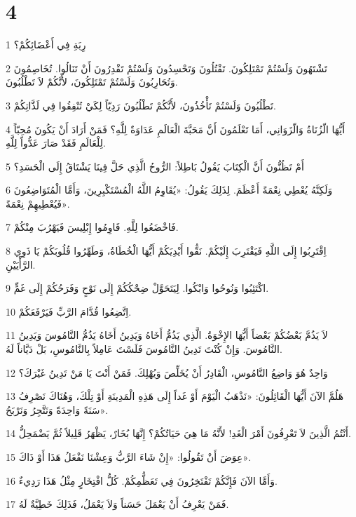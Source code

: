 \chapter{4}

\par 1 رِبَةِ فِي أَعْضَائِكُمْ؟
\par 2 تَشْتَهُونَ وَلَسْتُمْ تَمْتَلِكُونَ. تَقْتُلُونَ وَتَحْسِدُونَ وَلَسْتُمْ تَقْدِرُونَ أَنْ تَنَالُوا. تُخَاصِمُونَ وَتُحَارِبُونَ وَلَسْتُمْ تَمْتَلِكُونَ، لأَنَّكُمْ لاَ تَطْلُبُونَ.
\par 3 تَطْلُبُونَ وَلَسْتُمْ تَأْخُذُونَ، لأَنَّكُمْ تَطْلُبُونَ رَدِيّاً لِكَيْ تُنْفِقُوا فِي لَذَّاتِكُمْ.
\par 4 أَيُّهَا الّزُنَاةُ وَالّزَوَانِي، أَمَا تَعْلَمُونَ أَنَّ مَحَبَّةَ الْعَالَمِ عَدَاوَةٌ لِلَّهِ؟ فَمَنْ أَرَادَ أَنْ يَكُونَ مُحِبّاً لِلْعَالَمِ فَقَدْ صَارَ عَدُّواً لِلَّهِ.
\par 5 أَمْ تَظُنُّونَ أَنَّ الْكِتَابَ يَقُولُ بَاطِلاً: الرُّوحُ الَّذِي حَلَّ فِينَا يَشْتَاقُ إِلَى الْحَسَدِ؟
\par 6 وَلَكِنَّهُ يُعْطِي نِعْمَةً أَعْظَمَ. لِذَلِكَ يَقُولُ: «يُقَاوِمُ اللَّهُ الْمُسْتَكْبِرِينَ، وَأَمَّا الْمُتَوَاضِعُونَ فَيُعْطِيهِمْ نِعْمَةً».
\par 7 فَاخْضَعُوا لِلَّهِ. قَاوِمُوا إِبْلِيسَ فَيَهْرُبَ مِنْكُمْ.
\par 8 اِقْتَرِبُوا إِلَى اللَّهِ فَيَقْتَرِبَ إِلَيْكُمْ. نَقُّوا أَيْدِيَكُمْ أَيُّهَا الْخُطَاةُ، وَطَهِّرُوا قُلُوبَكُمْ يَا ذَوِي الرَّأْيَيْنِ.
\par 9 اكْتَئِبُوا وَنُوحُوا وَابْكُوا. لِيَتَحَوَّلْ ضِحْكُكُمْ إِلَى نَوْحٍ وَفَرَحُكُمْ إِلَى غَمٍّ.
\par 10 اِتَّضِعُوا قُدَّامَ الرَّبِّ فَيَرْفَعَكُمْ.
\par 11 لاَ يَذُمَّ بَعْضُكُمْ بَعْضاً أَيُّهَا الإِخْوَةُ. الَّذِي يَذُمُّ أَخَاهُ وَيَدِينُ أَخَاهُ يَذُمُّ النَّامُوسَ وَيَدِينُ النَّامُوسَ. وَإِنْ كُنْتَ تَدِينُ النَّامُوسَ فَلَسْتَ عَامِلاً بِالنَّامُوسِ، بَلْ دَيَّاناً لَهُ.
\par 12 وَاحِدٌ هُوَ وَاضِعُ النَّامُوسِ، الْقَادِرُ أَنْ يُخَلِّصَ وَيُهْلِكَ. فَمَنْ أَنْتَ يَا مَنْ تَدِينُ غَيْرَكَ؟
\par 13 هَلُمَّ الآنَ أَيُّهَا الْقَائِلُونَ: «نَذْهَبُ الْيَوْمَ أَوْ غَداً إِلَى هَذِهِ الْمَدِينَةِ أَوْ تِلْكَ، وَهُنَاكَ نَصْرِفُ سَنَةً وَاحِدَةً وَنَتَّجِرُ وَنَرْبَحُ».
\par 14 أَنْتُمُ الَّذِينَ لاَ تَعْرِفُونَ أَمْرَ الْغَدِ! لأَنَّهُ مَا هِيَ حَيَاتُكُمْ؟ إِنَّهَا بُخَارٌ، يَظْهَرُ قَلِيلاً ثُمَّ يَضْمَحِلُّ.
\par 15 عِوَضَ أَنْ تَقُولُوا: «إِنْ شَاءَ الرَّبُّ وَعِشْنَا نَفْعَلُ هَذَا أَوْ ذَاكَ».
\par 16 وَأَمَّا الآنَ فَإِنَّكُمْ تَفْتَخِرُونَ فِي تَعَظُّمِكُمْ. كُلُّ افْتِخَارٍ مِثْلُ هَذَا رَدِيءٌ.
\par 17 فَمَنْ يَعْرِفُ أَنْ يَعْمَلَ حَسَناً وَلاَ يَعْمَلُ، فَذَلِكَ خَطِيَّةٌ لَهُ.

